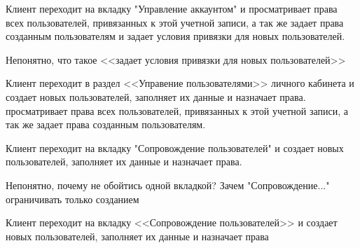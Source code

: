{


\begin{wiki}
Клиент переходит на вкладку "Управление аккаунтом" и просматривает права всех пользователей, привязанных к этой учетной записи, а так же задает права созданным пользователям и задает условия привязки для новых пользователей.
\end{wiki}


\begin{teamidea}
Непонятно, что такое <<задает условия привязки для новых пользователей>>
\end{teamidea}


\begin{itogo}
Клиент переходит в раздел <<Управение пользователями>> личного кабинета и создает новых пользователей, заполняет их данные и назначает права. просматривает права всех пользователей, привязанных к этой учетной записи, а так же задает права созданным пользователям.
\end{itogo}


}



{


\begin{wiki}
Клиент переходит на вкладку "Сопровождение пользователей" и создает новых пользователей, заполняет их данные и назначает права.
\end{wiki}

\begin{teamidea}
Непонятно, почему не обойтись одной вкладкой? Зачем "Сопровождение..." ограничивать только созданием
\end{teamidea}


\begin{itogo}
Клиент переходит на вкладку <<Сопровождение пользователей>> и создает новых пользователей, заполняет их данные и назначает права
\end{itogo}

}
\ifcand
